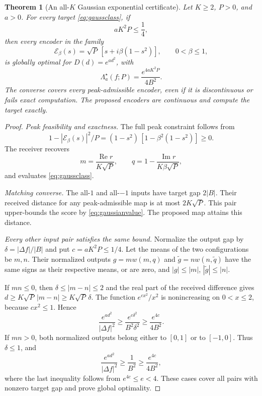\documentclass[11pt,letterpaper]{article}
\newtheorem{theorem}{Theorem}
\theoremstyle{remark}
\newcommand{\enc}{\mathscr E}
\begin{document}
\begin{theorem}[An all-$K$ Gaussian exponential certificate]
\label{thm:gaussian}
Let $K\ge2$, $P>0$, and $a>0$. For every target \eqref{eq:gaussclass}, if
\begin{equation}
 aK^2P\le\frac14,
 \label{eq:regime}
\end{equation}
then every encoder in the family
\begin{equation}
 \boxed{\enc_\beta(s)=\sqrt P\,[s+i\beta(1-s^2)]},
 \qquad0<\beta\le1,
 \label{eq:gaussianmap}
\end{equation}
is globally optimal for $D(d)=e^{ad^2}$, with
\begin{equation}
 \boxed{\Lambda_a^\star(f;P)=\frac{e^{4aK^2P}}{4B^2}}.
 \label{eq:gaussianvalue}
\end{equation}
The converse covers every peak-admissible encoder, even if it is discontinuous or fails exact computation. The proposed encoders are continuous and compute the target exactly.
\end{theorem}
\begin{proof}
\emph{Peak feasibility and exactness.}
The full peak constraint follows from
$$
 1-|\enc_\beta(s)|^2/P
 =(1-s^2)\,[1-\beta^2(1-s^2)]\ge0.
$$
The receiver recovers
$$
 m=\frac{\operatorname{Re}r}{K\sqrt P},\qquad
 q=1-\frac{\operatorname{Im}r}{K\beta\sqrt P},
$$
and evaluates \eqref{eq:gaussclass}.

\emph{Matching converse.}
The all-$1$ and all-$-1$ inputs have target gap $2|B|$. Their received distance for any peak-admissible map is at most $2K\sqrt P$. This pair upper-bounds the score by \eqref{eq:gaussianvalue}. The proposed map attains this distance.

\emph{Every other input pair satisfies the same bound.}
Normalize the output gap by $\delta=|\Delta f|/|B|$ and put $c=aK^2P\le1/4$. Let the means of the two configurations be $m,n$. Their normalized outputs $g=mw(m,q)$ and $\widetilde g=nw(n,\widetilde q)$ have the same signs as their respective means, or are zero, and $|g|\le|m|$, $|\widetilde g|\le|n|$.

If $mn\le0$, then $\delta\le|m-n|\le2$ and the real part of the received difference gives $d\ge K\sqrt P\,|m-n|\ge K\sqrt P\,\delta$. The function $e^{cx^2}/x^2$ is nonincreasing on $0<x\le2$, because $cx^2\le1$. Hence
$$
 \frac{e^{ad^2}}{|\Delta f|^2}
 \ge\frac{e^{c\delta^2}}{B^2\delta^2}
 \ge\frac{e^{4c}}{4B^2}.
$$
If $mn>0$, both normalized outputs belong either to $[0,1]$ or to $[-1,0]$. Thus $\delta\le1$, and
$$
 \frac{e^{ad^2}}{|\Delta f|^2}
 \ge\frac1{B^2}
 \ge\frac{e^{4c}}{4B^2},
$$
where the last inequality follows from $e^{4c}\le e<4$. These cases cover all pairs with nonzero target gap and prove global optimality.
\end{proof}
\end{document}
